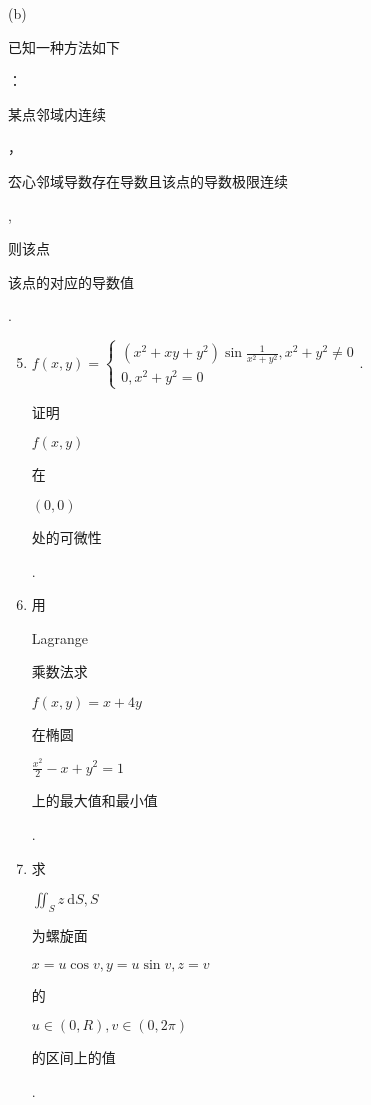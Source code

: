 \documentclass[10pt]{article}
\begin{document}
(b) \begin{CJK}{UTF8}{mj}已知一种方法如下\end{CJK}：\begin{CJK}{UTF8}{mj}某点邻域内连续\end{CJK}，\begin{CJK}{UTF8}{mj}厺心邻域导数存在导数且该点的导数极限连续\end{CJK}, \begin{CJK}{UTF8}{mj}则该点\end{CJK} \begin{CJK}{UTF8}{mj}该点的对应的导数值\end{CJK}.

\begin{enumerate}
  \setcounter{enumi}{4}
  \item $f(x, y)=\left\{\begin{array}{l}\left(x^{2}+x y+y^{2}\right) \sin \frac{1}{x^{2}+y^{2}}, x^{2}+y^{2} \neq 0 \\ 0, x^{2}+y^{2}=0\end{array}\right.$. \begin{CJK}{UTF8}{mj}证明\end{CJK} $f(x, y)$ \begin{CJK}{UTF8}{mj}在\end{CJK} $(0,0)$ \begin{CJK}{UTF8}{mj}处的可微性\end{CJK}.

  \item \begin{CJK}{UTF8}{mj}用\end{CJK} Lagrange \begin{CJK}{UTF8}{mj}乘数法求\end{CJK} $f(x, y)=x+4 y$ \begin{CJK}{UTF8}{mj}在椭圆\end{CJK} $\frac{x^{2}}{2}-x+y^{2}=1$ \begin{CJK}{UTF8}{mj}上的最大值和最小值\end{CJK}.

  \item \begin{CJK}{UTF8}{mj}求\end{CJK} $\iint_{S} z \mathrm{~d} S, S$ \begin{CJK}{UTF8}{mj}为螺旋面\end{CJK} $x=u \cos v, y=u \sin v, z=v$ \begin{CJK}{UTF8}{mj}的\end{CJK} $u \in(0, R), v \in(0,2 \pi)$ \begin{CJK}{UTF8}{mj}的区间上的值\end{CJK}.


\end{enumerate}
\end{document}
